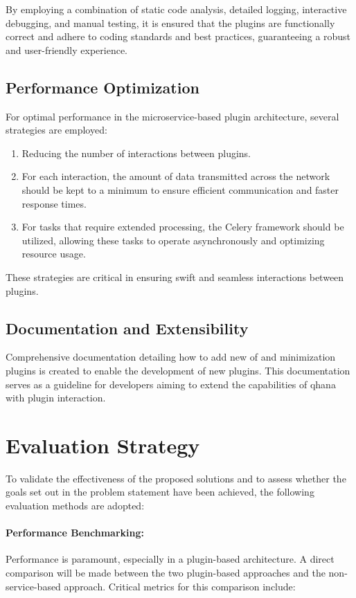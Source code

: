 \documentclass[
  a4paper,  %
  twoside,  %
  bibliography=totoc,
  headsepline,
  cleardoublepage=empty,
  parskip=half,
  draft=false
]{scrbook}
\begin{document}
By employing a combination of static code analysis, detailed logging, interactive debugging, and manual testing, it is ensured that the plugins are functionally correct and adhere to coding standards and best practices, guaranteeing a robust and user-friendly experience.


\subsection{Performance Optimization}
For optimal performance in the microservice-based plugin architecture, several strategies are employed:

\begin{enumerate}
    \item Reducing the number of interactions between plugins.
    \item For each interaction, the amount of data transmitted across the network should be kept to a minimum to ensure efficient communication and faster response times.
    \item For tasks that require extended processing, the Celery framework should be utilized, allowing these tasks to operate asynchronously and optimizing resource usage.
\end{enumerate}

These strategies are critical in ensuring swift and seamless interactions between plugins.


\subsection{Documentation and Extensibility}
Comprehensive documentation detailing how to add new \gls{of} and minimization plugins is created to enable the development of new plugins.
This documentation serves as a guideline for developers aiming to extend the capabilities of \gls{qhana} with plugin interaction.


\section{Evaluation Strategy}
\label{sec:evaluationStrategy}

To validate the effectiveness of the proposed solutions and to assess whether the goals set out in the problem statement have been achieved, the following evaluation methods are adopted:

\paragraph{Performance Benchmarking:}
\label{subsec:performanceBenchmarking}
Performance is paramount, especially in a plugin-based architecture.
A direct comparison will be made between the two plugin-based approaches and the non-service-based approach.
Critical metrics for this comparison include:
\end{document}
